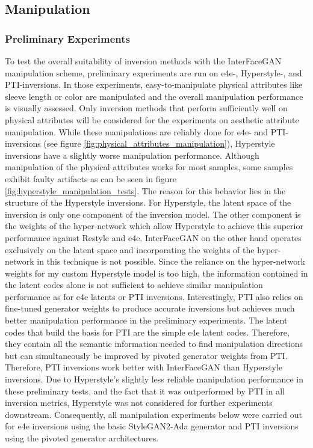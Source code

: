 \subsection{Manipulation}
\subsubsection{Preliminary Experiments}
To test the overall suitability of inversion methods with the InterFaceGAN manipulation scheme, preliminary experiments are run on e4e-, Hyperstyle-, and PTI-inversions. In those experiments, easy-to-manipulate physical attributes like sleeve length or color are manipulated and the overall manipulation performance is visually assessed. Only inversion methods that perform sufficiently well on physical attributes will be considered for the experiments on aesthetic attribute manipulation.
While these manipulations are reliably done for e4e- and PTI-inversions (see figure \ref{fig:physical_attributes_manipulation}), Hyperstyle inversions have a slightly worse manipulation performance. Although manipulation of the physical attributes works for most samples, some samples exhibit faulty artifacts as can be seen in figure \ref{fig:hyperstyle_manipulation_tests}. The reason for this behavior lies in the structure of the Hyperstyle inversions. For Hyperstyle, the latent space of the inversion is only one component of the inversion model. The other component is the weights of the hyper-network which allow Hyperstyle to achieve this superior performance against Restyle and e4e. InterFaceGAN on the other hand operates exclusively on the latent space and incorporating the weights of the hyper-network in this technique is not possible. Since the reliance on the hyper-network weights for my custom Hyperstyle model is too high, the information contained in the latent codes alone is not sufficient to achieve similar manipulation performance as for e4e latents or PTI inversions. Interestingly, PTI also relies on fine-tuned generator weights to produce accurate inversions but achieves much better manipulation performance in the preliminary experiments. The latent codes that build the basis for PTI are the simple e4e latent codes. Therefore, they contain all the semantic information needed to find manipulation directions but can simultaneously be improved by pivoted generator weights from PTI. Therefore, PTI inversions work better with InterFaceGAN than Hyperstyle inversions. Due to Hyperstyle's slightly less reliable manipulation performance in these preliminary tests, and the fact that it was outperformed by PTI in all inversion metrics, Hyperstyle was not considered for further experiments downstream. Consequently, all manipulation experiments below were carried out for e4e inversions using the basic StyleGAN2-Ada generator and PTI inversions using the pivoted generator architectures.

